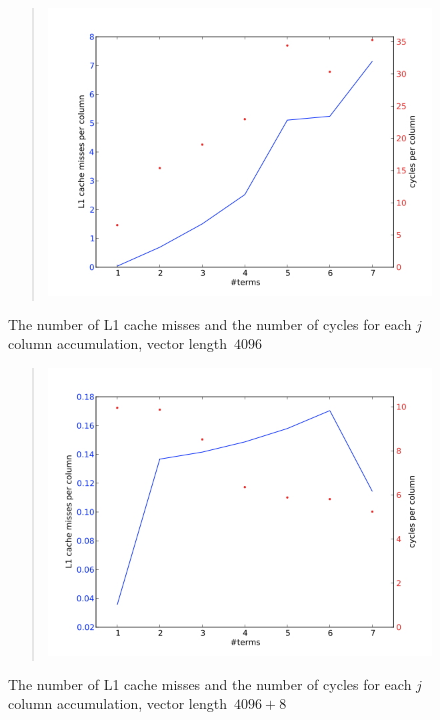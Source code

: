 \begin{figure}
  \begin{quote}
  \includegraphics[scale=.5]{graphics/l1_assoc}
  \end{quote}
  \caption{The number of L1 cache misses and the number of cycles for
    each $j$ column accumulation, vector length~$4096$}
  \label{fig:l1_assoc}
\end{figure}

\begin{figure}
  \begin{quote}
  \includegraphics[scale=.5]{graphics/l1_assocshift}
  \end{quote}
  \caption{The number of L1 cache misses and the number of cycles for
    each $j$ column accumulation, vector length~$4096+8$}
  \label{fig:l1_assoc_shift}
\end{figure}

